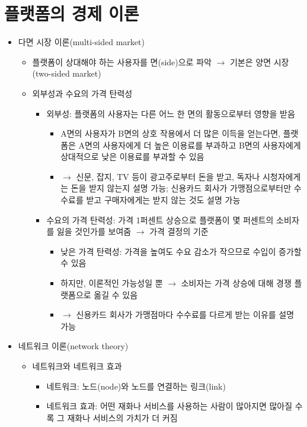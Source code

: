 \section{플랫폼의 경제 이론}
\begin{itemize}
\item 다면 시장 이론(multi-sided market) \cite[pp. 383--388]{Tirole:2017aa}
	\begin{itemize}
	\item 플랫폼이 상대해야 하는 사용자를 면(side)으로 파악 $\rightarrow$ 기본은 양면 시장(two-sided market)
	\item 외부성과 수요의 가격 탄력성
		\begin{itemize}
		\item 외부성: 플랫폼의 사용자는 다른 어느 한 면의 활동으로부터 영향을 받음
			\begin{itemize}
			\item A면의 사용자가 B면의 상호 작용에서 더 많은 이득을 얻는다면, 플랫폼은 A면의 사용자에게 더 높은 이용료를 부과하고 B면의 사용자에게 상대적으로 낮은 이용료를 부과할 수 있음
			\item $\rightarrow$ 신문, 잡지, TV 등이 광고주로부터 돈을 받고, 독자나 시청자에게는 돈을 받지 않는지 설명 가능; 신용카드 회사가 가맹점으로부터만 수수료를 받고 구매자에게는 받지 않는 것도 설명 가능
			\end{itemize}
		\item 수요의 가격 탄력성: 가격 1퍼센트 상승으로 플랫폼이 몇 퍼센트의 소비자를 잃을 것인가를 보여줌 $\rightarrow$ 가격 결정의 기준
			\begin{itemize}
			\item 낮은 가격 탄력성: 가격을 높여도 수요 감소가 작으므로 수입이 증가할 수 있음
			\item 하지만, 이론적인 가능성일 뿐 $\rightarrow$ 소비자는 가격 상승에 대해 경쟁 플랫폼으로 옮길 수 있음
			\item $\rightarrow$ 신용카드 회사가 가맹점마다 수수료를 다르게 받는 이유를 설명 가능
			\end{itemize}	
		\end{itemize}
	\end{itemize}
\item 네트워크 이론(network theory)
	\begin{itemize}
	\item 네트워크와 네트워크 효과
		\begin{itemize}
		\item 네트워크: 노드(node)와 노드를 연결하는 링크(link)
		\item 네트워크 효과: 어떤 재화나 서비스를 사용하는 사람이 많아지면 많아질 수록 그 재화나 서비스의 가치가 더 커짐

\end{itemize}
\end{itemize}
\end{itemize}
